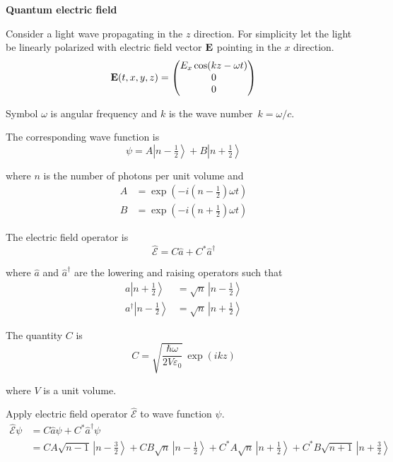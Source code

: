 \documentclass[12pt]{article}
\begin{document}
\noindent
{\bf Quantum electric field}

\bigskip
\noindent
Consider a light wave propagating in the $z$ direction.
For simplicity let the light be linearly polarized with electric
field vector $\bf E$ pointing in the $x$ direction.
\begin{equation*}
{\bf E}(t,x,y,z)=\begin{pmatrix}E_x\cos(kz-\omega t)\\0\\0\end{pmatrix}
\end{equation*}

\noindent
Symbol $\omega$ is angular frequency and $k$ is the wave number~$k=\omega/c$.

\bigskip
\noindent
The corresponding wave function is
\begin{equation*}
\psi=A\left|n-\tfrac{1}{2}\right\rangle
+B\left|n+\tfrac{1}{2}\right\rangle
\end{equation*}

\noindent
where $n$ is the number of photons per unit volume and
\begin{align*}
A&=\exp\left(-i\left(n-\tfrac{1}{2}\right)\omega t\right)\\
B&=\exp\left(-i\left(n+\tfrac{1}{2}\right)\omega t\right)
\end{align*}

\noindent
The electric field operator is
\begin{equation*}
\hat{\mathscr{E}}=C\hat{a}+C^*\hat{a}^\dagger
\end{equation*}

\noindent
where $\hat{a}$ and $\hat{a}^\dagger$ are the lowering and raising operators such that
\begin{align*}
a\left|n+\tfrac{1}{2}\right\rangle&=\sqrt{n}\,\left|n-\tfrac{1}{2}\right\rangle\\
a^\dagger\left|n-\tfrac{1}{2}\right\rangle&=\sqrt{n}\,\left|n+\tfrac{1}{2}\right\rangle
\end{align*}

\noindent
The quantity $C$ is
\begin{equation*}
C=\sqrt{\frac{\hbar\omega}{2V\varepsilon_0}}\,\exp(ikz)
\end{equation*}

\noindent
where $V$ is a unit volume.

\bigskip
\noindent
Apply electric field operator $\hat{\mathscr{E}}$ to wave function $\psi$.
\begin{align*}
\hat{\mathscr{E}}\psi
&=C\hat{a}\psi+C^*\hat{a}^\dagger\psi\\
&=CA\sqrt{n-1}\,\left|n-\tfrac{3}{2}\right\rangle+CB\sqrt{n}\,\left|n-\tfrac{1}{2}\right\rangle
+C^*A\sqrt{n}\,\left|n+\tfrac{1}{2}\right\rangle+C^*B\sqrt{n+1}\,\left|n+\tfrac{3}{2}\right\rangle
\end{align*}
\end{document}
